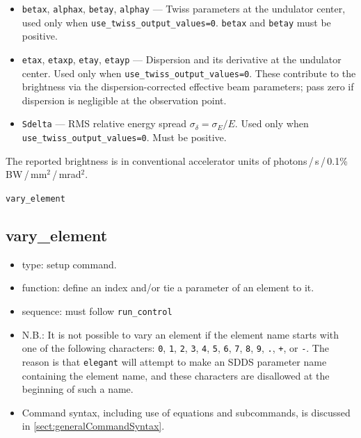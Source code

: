 \documentclass[11pt]{article}
\begin{document}
\begin{itemize}
\item \verb|betax|, \verb|alphax|, \verb|betay|, \verb|alphay| ---
        Twiss parameters at the undulator center, used only when
        \verb|use_twiss_output_values=0|.  \verb|betax| and \verb|betay|
        must be positive.

\item \verb|etax|, \verb|etaxp|, \verb|etay|, \verb|etayp| ---
        Dispersion and its derivative at the undulator center.  Used
        only when \verb|use_twiss_output_values=0|.  These contribute to
        the brightness via the dispersion-corrected effective beam
        parameters; pass zero if dispersion is negligible at the
        observation point.

\item \verb|Sdelta| --- RMS relative energy spread $\sigma_\delta =
        \sigma_E / E$.  Used only when
        \verb|use_twiss_output_values=0|.  Must be positive.

\end{itemize}

The reported brightness is in conventional accelerator units of
photons\,/\,s\,/\,0.1\%\,BW\,/\,mm$^2$\,/\,mrad$^2$.

\newpage
\begin{center}{\Large\verb|vary_element|}\end{center}
\subsection{vary\_element \label{subsec:varyelement}}

\begin{itemize}
\item type: setup command.
\item function: define an index and/or tie a parameter of an element to it.
\item sequence: must follow \verb|run_control|
\item N.B.: It is not possible to vary an element if the element name starts with one of the following
characters: 
\verb|0|, \verb|1|, \verb|2|, \verb|3|, \verb|4|, \verb|5|, \verb|6|, \verb|7|, \verb|8|,
\verb|9|, \verb|.|, \verb|+|, or \verb|-|.  The reason is that {\tt elegant} will attempt to 
make an SDDS parameter name containing the element name, and these characters are disallowed
at the beginning of such a name.
\item Command syntax, including use of equations and subcommands, is discussed in \ref{sect:generalCommandSyntax}.
\end{itemize}
\end{document}
